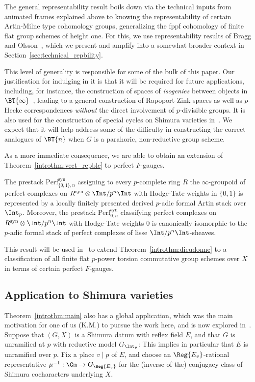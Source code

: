 \documentclass[10pt]{amsart}
\begin{document}
The general representability result boils down via the technical inputs from animated frames explained above to knowing the representability of certain Artin-Milne type cohomology groups, generalizing the fppf cohomology of finite flat group schemes of height one. For this, we use representability results of Bragg and Olsson~\cite{bragg2021representability}, which we present and amplify into a somewhat broader context in Section~\ref{sec:technical_repbility}.

This level of generality is responsible for some of the bulk of this paper. Our justification for indulging in it is that it will be required for future applications, including, for instance, the construction of spaces of \emph{isogenies} between objects in $\BT{\infty}$~\cite{lee_madapusi}, leading to a general construction of Rapoport-Zink spaces as well as $p$-Hecke correspondences \emph{without} the direct involvement of $p$-divisible groups. It is also used for the construction of special cycles on Shimura varieties in~\cite{Madapusi2022-rp}. We expect that it will help address some of the difficulty in constructing the correct analogues of $\BT{n}$ when $G$ is a parahoric, non-reductive group scheme.

As a more immediate consequence, we are able to obtain an extension of Theorem~\ref{introthm:vect_repble} to perfect $F$-gauges.
\begin{introthm}
\label{introthm:perf_fgauges}
The prestack $\mathrm{Perf}^{\mathrm{syn}}_{\{0,1\},n}$ assigning to every $p$-complete ring $R$ the $\infty$-groupoid of perfect complexes on $R^{\mathrm{syn}}\otimes\Int/p^n\Int$ with Hodge-Tate weights in $\{0,1\}$ is represented by a locally finitely presented derived $p$-adic formal Artin stack over $\Int_p$. Moreover, the prestack $\mathrm{Perf}^{\mathrm{syn}}_{0,n}$ classifying perfect complexes on $R^{\mathrm{syn}}\otimes\Int/p^n\Int$ with Hodge-Tate weights $0$ is canonically isomorphic to the $p$-adic formal stack of perfect complexes of lisse $\Int/p^n\Int$-sheaves.
\end{introthm}

This result will be used in~\cite{madapusi_mondal} to extend Theorem~\ref{introthm:dieudonne} to a classification of all finite flat $p$-power torsion commutative group schemes over $X$ in terms of certain perfect $F$-gauges.


\subsection{Application to Shimura varieties}
Theorem~\ref{introthm:main} also has a global application, which was the main motivation for one of us (K.M.) to pursue the work here, and is now explored in~\cite{MadYoucis}. Suppose that $(G,X)$ is a Shimura datum with reflex field $E$, and that $G$ is unramified at $p$ with reductive model $G_{\Int_p}$: This implies in particular that $E$ is unramified over $p$. Fix a place $v\mid p$ of $E$, and choose an $\Reg{E_v}$-rational representative $\mu^{-1}:\Gm\to G_{\Reg{E_v}}$ for the (inverse of the) conjugacy class of Shimura cocharacters underlying $X$. 
\end{document}
